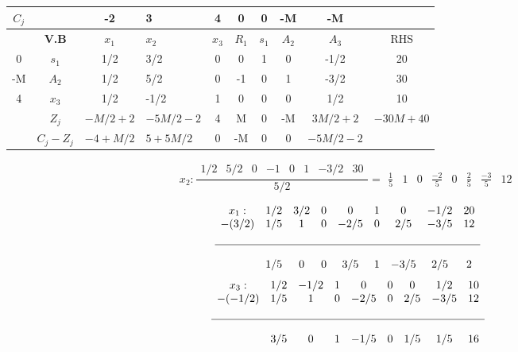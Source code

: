 \documentclass{templateNote}
\begin{document}
\begin{center}
    \begin{tabular}{|c|c|c|g|c|c|c|c|c|c|}
        \hline
        $C_j$ & & -2 & 3 & 4 & 0 & 0 & -M & -M & \\ \hline
        & \textbf{V.B} & $x_1$ & $x_2$ & $x_3$ & $R_1$ & $s_1$ & $A_2$ & $A_3$ & RHS \\  & $s_1$ & 1/2 & 3/2 & 0 & 0 & 1 & 0 & -1/2 & 20 \\ \hline
        -M & $A_2$ & 1/2 & 5/2 & 0 & -1 & 0 & 1 & -3/2 & 30 \\  & $x_3$ & 1/2 & -1/2 & 1 & 0 & 0 & 0 & 1/2 & 10 \\ \hline
        & $Z_j$ & $-M/2 + 2$ & $-5M/2 - 2$ & 4 & M & 0 & -M & $3M/2 + 2$ & \underline{$-30M + 40$} \\ \hline
        & $C_j - Z_j$ & $-4 +M/2$ & $5+5M/2$ & 0 & -M & 0 & 0 & $-5M/2 -2$ & \\ \hline
    \end{tabular}
\end{center}
\begin{center}
    \begin{equation*}
        x_2: \frac{\begin{array}{cccccccc} 1/2 & 5/2 & 0 & -1 & 0 & 1 & -3/2 & 30 \end{array}}{5/2} = \begin{array}{cccccccc} \frac{1}{5} & 1 & 0 & \frac{-2}{5} & 0 & \frac{2}{5} & \frac{-3}{5} & 12 \end{array}
    \end{equation*}
\end{center}
\begin{equation*}
    \begin{array}{ccccccccc}
        x_1: & 1/2 & 3/2 & 0 & 0 & 1 & 0 & -1/2 & 20 \\
        -(3/2) & 1/5 & 1 & 0 & -2/5 & 0 & 2/5 & -3/5 & 12 \\
        \\ \hline \\
        & 1/5 & 0 & 0 & 3/5 & 1 & -3/5 & 2/5 & 2
    \end{array}
\end{equation*}
\begin{equation*}
    \begin{array}{ccccccccc}
        x_3: & 1/2 & -1/2 & 1 & 0 & 0 & 0 & 1/2 & 10 \\
        -(-1/2) & 1/5 & 1 & 0 & -2/5 & 0 & 2/5 & -3/5 & 12 \\
        \\ \hline \\
        & 3/5 & 0 & 1 & -1/5 & 0 & 1/5 & 1/5 & 16
    \end{array}
\end{equation*}
\end{document}
